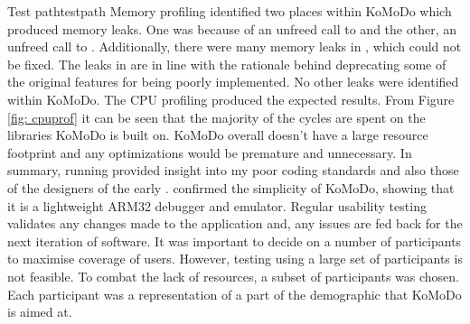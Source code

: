 {
		}{Test path}{testpath}
%
Memory profiling identified two places within KoMoDo which produced memory leaks. One was because of an unfreed call to  and the other, an unfreed call to . Additionally, there were many memory leaks in , which could not be fixed. The leaks in  are in line with the rationale behind deprecating some of the original features for being poorly implemented.
%
No other leaks were identified within KoMoDo.
%
The CPU profiling produced the expected results. From Figure \ref{fig: cpuprof} it can be seen that the majority of the cycles are spent on the libraries KoMoDo is built on. KoMoDo overall doesn't have a large resource footprint and any optimizations would be premature and unnecessary.
\pagebreak
{}
In summary, running  provided insight into my poor coding standards and also those of the designers of the early .  confirmed the simplicity of KoMoDo, showing that it is a lightweight ARM32 debugger and emulator.
%
%
%
%
%
Regular usability testing validates any changes made to the application and, any issues are fed back for the next iteration of software. It was important to decide on a number of participants to maximise coverage of users. However, testing using a large set of participants is not feasible. To combat the lack of resources, a subset of participants was chosen. Each participant was a representation of a part of the demographic that KoMoDo is aimed at.\\\\
